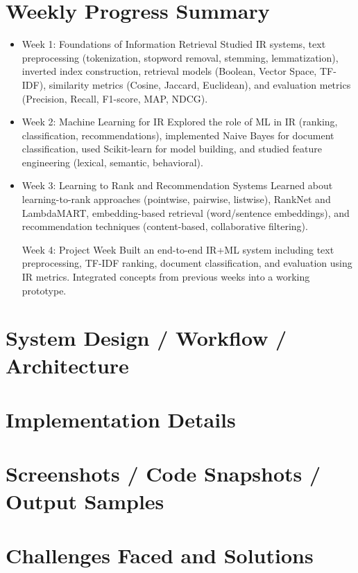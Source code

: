 \documentclass[12pt,a4paper]{report}
\begin{document}
\section{Weekly Progress Summary}
\begin{itemize}

  \item Week 1: Foundations of Information Retrieval
Studied IR systems, text preprocessing (tokenization, stopword removal, stemming, lemmatization), inverted index construction, retrieval models (Boolean, Vector Space, TF-IDF), similarity metrics (Cosine, Jaccard, Euclidean), and evaluation metrics (Precision, Recall, F1-score, MAP, NDCG).

 \item Week 2: Machine Learning for IR
Explored the role of ML in IR (ranking, classification, recommendations), implemented Naive Bayes for document classification, used Scikit-learn for model building, and studied feature engineering (lexical, semantic, behavioral).

 \item Week 3: Learning to Rank and Recommendation Systems
Learned about learning-to-rank approaches (pointwise, pairwise, listwise), RankNet and LambdaMART, embedding-based retrieval (word/sentence embeddings), and recommendation techniques (content-based, collaborative filtering).

Week 4: Project Week
Built an end-to-end IR+ML system including text preprocessing, TF-IDF ranking, document classification, and evaluation using IR metrics. Integrated concepts from previous weeks into a working prototype.
\end{itemize}

\newpage
\section{System Design / Workflow / Architecture}

\newpage
\section{Implementation Details}

\newpage
\section{Screenshots / Code Snapshots / Output Samples}

\newpage
\section{Challenges Faced and Solutions}
\end{document}
